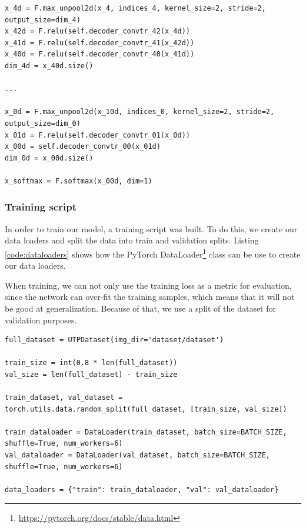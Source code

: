 \begin{lstlisting}[style=Python-color, caption=Forward function on the decoder, frame=single, label=code:decoder_forward]
x_4d = F.max_unpool2d(x_4, indices_4, kernel_size=2, stride=2, output_size=dim_4)
x_42d = F.relu(self.decoder_convtr_42(x_4d))
x_41d = F.relu(self.decoder_convtr_41(x_42d))
x_40d = F.relu(self.decoder_convtr_40(x_41d))
dim_4d = x_40d.size()

...

x_0d = F.max_unpool2d(x_10d, indices_0, kernel_size=2, stride=2, output_size=dim_0)
x_01d = F.relu(self.decoder_convtr_01(x_0d))
x_00d = self.decoder_convtr_00(x_01d)
dim_0d = x_00d.size()

x_softmax = F.softmax(x_00d, dim=1)

\end{lstlisting}

\subsubsection{Training script}
\label{sec:train_script}

In order to train our model, a training script was built. To do this, we create our data loaders and split the data into train and validation splits. Listing \ref{code:dataloaders} shows how the PyTorch DataLoader\footnote{\url{https://pytorch.org/docs/stable/data.html}} class can be use to create our data loaders.

When training, we can not only use the training loss as a metric for evaluation, since the network can over-fit the training samples, which means that it will not be good at generalization. Because of that, we use a split of the dataset for validation purposes.

\begin{lstlisting}[style=Python-color, caption=Data loaders and train-val split, frame=single, label=code:dataloaders]
full_dataset = UTPDataset(img_dir='dataset/dataset')

train_size = int(0.8 * len(full_dataset))
val_size = len(full_dataset) - train_size

train_dataset, val_dataset = torch.utils.data.random_split(full_dataset, [train_size, val_size])

train_dataloader = DataLoader(train_dataset, batch_size=BATCH_SIZE, shuffle=True, num_workers=6)
val_dataloader = DataLoader(val_dataset, batch_size=BATCH_SIZE, shuffle=True, num_workers=6)

data_loaders = {"train": train_dataloader, "val": val_dataloader}

\end{lstlisting}

